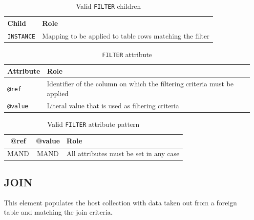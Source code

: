 \documentclass[11pt,a4paper]{ivoa}
\begin{document}
\begin{table}[hbtp]
\small
\centering
\begin{tabulary}{\linewidth}{|L|J|}
       \hline  
          \textbf{Child} &  
          \textbf{Role}\\
       \hline  \hline
          \texttt{INSTANCE}    & 
          Mapping to be applied to table rows matching the filter \\       
       \hline 
     \end{tabulary}
     \caption{Valid  \texttt{FILTER} children} 
     \label{tbl:filter-children}
\end{table}

\begin{table}[!htbp]
\small
\centering
\begin{tabulary}{\linewidth}{|L|J|}
       \hline
           \textbf{Attribute} &  
           \textbf{Role} \\
       \hline  \hline
           \texttt{@ref}    & 
           Identifier of the column on which the filtering criteria must be applied \\       
        \hline 
           \texttt{@value}    & 
           Literal value that is used as filtering criteria \\       
        \hline 
\end{tabulary}
\caption{\texttt{FILTER} attribute} 
\label{tbl:filter-att}
\end{table}

\begin{table}[!t]
\small
\centering
\begin{tabulary}{\linewidth}{|C|CJ|}
       \hline
           \textbf{@ref} &  
           \textbf{@value} &                     

           \textbf{Role} \\
       \hline   \hline
           MAND    &            

           MAND    & 
           All attributes must be set in any case \\       
       \hline 
\end{tabulary}
\caption{Valid \texttt{FILTER} attribute pattern} 
\label{tbl:filter-patterns}
\end{table}


%
%
\clearpage
\subsection{JOIN}
This element populates the host collection with data taken out from a foreign table and matching the join criteria.
\end{document}

